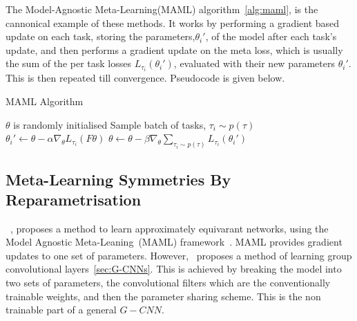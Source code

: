 The Model-Agnostic Meta-Learning(MAML) algorithm~\ref{alg:maml}, is the cannonical example of these methods. It works by performing a gradient based update on each task, storing the parameters,$\theta_i'$, of the model after each task's update, and then performs a gradient update on the meta loss, which is usually the sum of the per task losses $L_{\tau_i}(\theta_i')$, evaluated with their new parameters $\theta_i'$. This is then repeated till convergence. Pseudocode is given below.


\begin{algorithm}
	\caption{MAML Algorithm}
	\label{alg:maml}
	\begin{algorithmic}
		\State $\theta$ is randomly initialised
		\State Sample batch of tasks, $\tau_i \sim p(\tau)$
		\State $\theta_i' \leftarrow \theta - \alpha \nabla_\theta L_{\tau_i}(F\theta)$
		\EndFor
		\State $\theta \leftarrow \theta - \beta \nabla_\theta \sum_{\tau_i \sim p(\tau)}{L_{\tau_i}(\theta_i')}$
		\EndWhile
	\end{algorithmic}
\end{algorithm}


\subsection{Meta-Learning Symmetries By Reparametrisation}
~\cite{zhou2020meta}, proposes a method to learn approximately equivarant networks, using the Model Agnostic Meta-Leaning~(MAML) framework~\cite{finn2017model}. MAML provides gradient updates to one set of parameters. However,~\cite{zhou2020meta} proposes a method of learning group convolutional layers~\ref{sec:G-CNNs}. This is achieved by breaking the model into two sets of parameters, the convolutional filters which are the conventionally trainable weights, and then the parameter sharing scheme. This is the non trainable part of a general $G-CNN$.

